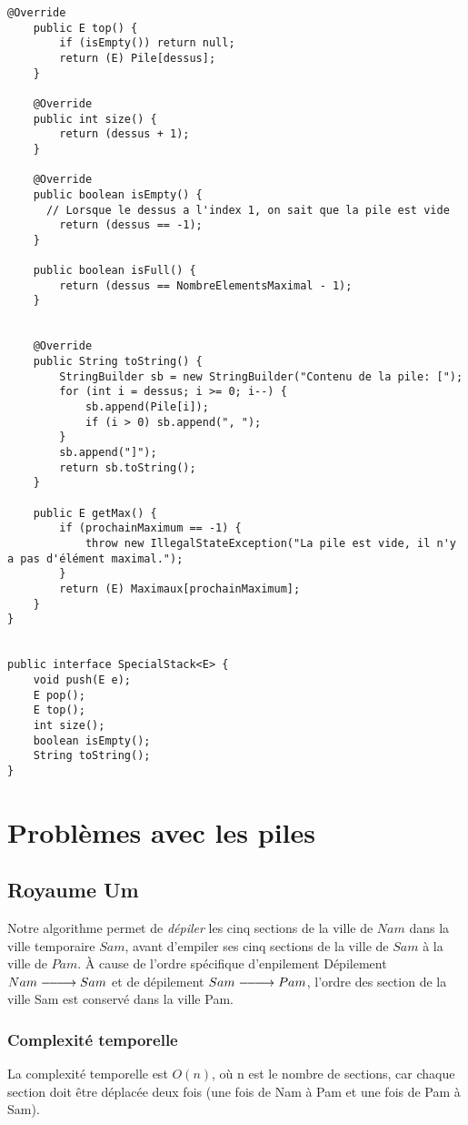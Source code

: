 \documentclass[10pt]{report}
\DeclareRobustCommand{\looongrightarrow}{%
  \DOTSB\relbar\joinrel\relbar\joinrel\relbar\joinrel\rightarrow
}
\DeclareRobustCommand{\looongrightarrow}{%
  \DOTSB\relbar\joinrel\relbar\joinrel\relbar\joinrel\rightarrow
}
\begin{document}
\begin{lstlisting}[style=JavaDraculaWhite]
    @Override
    public E top() {
        if (isEmpty()) return null;
        return (E) Pile[dessus];
    }

    @Override
    public int size() {
        return (dessus + 1);
    }

    @Override
    public boolean isEmpty() {
      // Lorsque le dessus a l'index 1, on sait que la pile est vide
        return (dessus == -1);
    }

    public boolean isFull() {
        return (dessus == NombreElementsMaximal - 1);
    }


    @Override
    public String toString() {
        StringBuilder sb = new StringBuilder("Contenu de la pile: [");
        for (int i = dessus; i >= 0; i--) {
            sb.append(Pile[i]);
            if (i > 0) sb.append(", ");
        }
        sb.append("]");
        return sb.toString();
    }

    public E getMax() {
        if (prochainMaximum == -1) {
            throw new IllegalStateException("La pile est vide, il n'y a pas d'élément maximal.");
        }
        return (E) Maximaux[prochainMaximum];
    }  
}


public interface SpecialStack<E> {
    void push(E e);
    E pop();
    E top();
    int size();
    boolean isEmpty();
    String toString();
}
    \end{lstlisting}


  \chapter{Problèmes avec les piles}

  \section{Royaume Um}
  Notre algorithme permet de \textit{dépiler} les cinq sections de la ville de 
  $Nam$ dans la ville temporaire $Sam$, avant d'empiler ses cinq sections 
  de la ville de $Sam$ à la ville de $Pam$. À cause de l'ordre spécifique 
  d'enpilement Dépilement $Nam \looongrightarrow Sam$ et de dépilement 
  $Sam \looongrightarrow Pam$, l'ordre des section de la ville Sam est 
  conservé dans la ville Pam. 

  \subsection{Complexité temporelle}
  La complexité temporelle est $O(n)$, où n est le nombre de sections, car chaque 
  section doit être déplacée deux fois (une fois de Nam à Pam et une fois de Pam à Sam).
  
\end{document}
